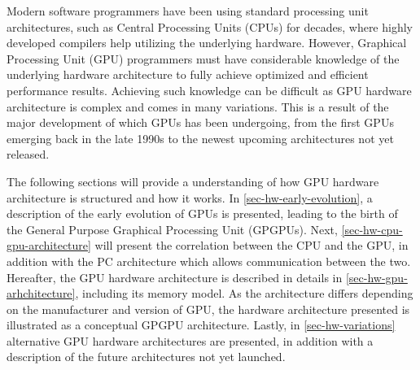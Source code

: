 Modern software programmers have been using standard processing unit architectures, such as Central Processing Units (CPUs) for decades, where highly developed compilers help utilizing the underlying hardware.
However, Graphical Processing Unit (GPU) programmers must have considerable knowledge of the underlying hardware architecture to fully achieve optimized and efficient performance results.
Achieving such knowledge can be difficult as GPU hardware architecture is complex and comes in many variations.
This is a result of the major development of which GPUs has been undergoing, from the first GPUs emerging back in the late 1990s to the newest upcoming architectures not yet released.

The following sections will provide a understanding of how GPU hardware architecture is structured and how it works.
In \cref{sec-hw-early-evolution}, a description of the early evolution of GPUs is presented, leading to the birth of the General Purpose Graphical Processing Unit (GPGPUs).
Next, \cref{sec-hw-cpu-gpu-architecture} will present the correlation between the CPU and the GPU, in addition with the PC architecture which allows communication between the two.
Hereafter, the GPU hardware architecture is described in details in \cref{sec-hw-gpu-arhchitecture}, including its memory model.
As the architecture differs depending on the manufacturer and version of GPU, the hardware architecture presented is illustrated as a conceptual GPGPU architecture.
Lastly, in \cref{sec-hw-variations} alternative GPU hardware architectures are presented, in addition with a description of the future architectures not yet launched.

 